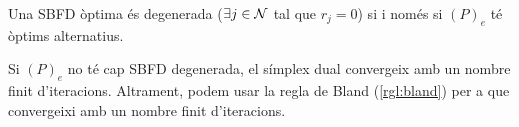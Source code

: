 \begin{prop}
    Una SBFD òptima és degenerada ($\exists j \in \mathcal{N}$ tal que $r_j = 0$) si i només si $\left(P\right)_e$ té òptims alternatius.
\end{prop}
\begin{prop}
    Si $\left(P\right)_e$ no té cap SBFD degenerada, el símplex dual convergeix amb un nombre finit d'iteracions. Altrament, podem usar la regla de Bland (\ref{rgl:bland}) per a que convergeixi amb un nombre finit d'iteracions.
\end{prop}